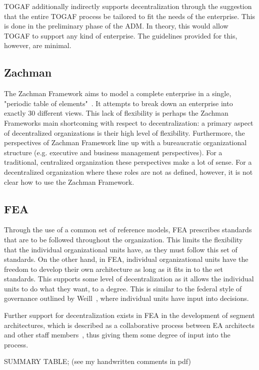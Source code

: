 
TOGAF additionally indirectly supports decentralization through the suggestion that the entire TOGAF process be tailored to fit the needs of the enterprise. This is done in the preliminary phase of the ADM. In theory, this would allow TOGAF to support any kind of enterprise. The guidelines provided for this, however, are minimal. 


\subsection{Zachman}
The Zachman Framework aims to model a complete enterprise in a single, "periodic table of elements"~\cite{Bente2012}. It attempts to break down an enterprise into exactly 30 different views. This lack of flexibility is perhaps the Zachman Frameworks main shortcoming with respect to decentralization: a primary aspect of decentralized organizations is their high level of flexibility. Furthermore, the perspectives of Zachman Framework line up with a bureaucratic organizational structure (e.g. executive and business management perspectives). For a traditional, centralized organization these perspectives make a lot of sense. For a decentralized organization where these roles are not as defined, however, it is not clear how to use the Zachman Framework. 

\subsection{FEA}

Through the use of a common set of reference models, FEA prescribes standards that are to be followed throughout the organization. This limits the flexibility that the individual organizational units have, as they must follow this set of standards. On the other hand, in FEA, individual organizational units have the freedom to develop their own architecture as long as it fits in to the set standards. This supports some level of decentralization as it allows the individual units to do what they want, to a degree. This is similar to the federal style of governance outlined by Weill~\cite{ross2006}, where individual units have input into decisions. 

Further support for decentralization exists in FEA in the development of segment architectures, which is described as a collaborative process between EA architects and other staff members~\cite{FederalEnterpriseArchitectureProgramManagementOffice2007}, thus giving them some degree of input into the process. 

SUMMARY TABLE;
(see my handwritten comments in pdf)
